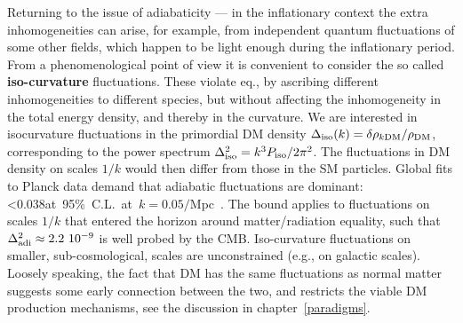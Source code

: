 Returning to the issue of adiabaticity --- in the inflationary context
the extra inhomogeneities can arise, for example, from independent quantum fluctuations
of some other fields, which happen to be light enough during the inflationary period.
From a phenomenological point of view
it is convenient to consider the so called {\bf iso-curvature} fluctuations. 
These violate eq., by ascribing different inhomogeneities to different species,
but without affecting the inhomogeneity in the total energy density, and thereby in the curvature.
We are interested in isocurvature fluctuations in the primordial DM density
$\Delta_{\rm iso} (k)= \delta \rho_{k\rm DM}/\rho_{\rm DM}$, corresponding to the power spectrum $\Delta^2_{\rm iso} = k^3 P_{\rm iso}/2\pi^2$.
The fluctuations in DM density on scales $1/k$ would then differ from those in the SM particles.
Global fits to Planck data demand that adiabatic fluctuations are dominant:
\beq\label{eq:isocurvaturebound}
 <0.038\qquad\hbox{at 95\% C.L.\ at $k =0.05/$Mpc~\cite{Planckresults}.}\eeq
The bound applies to fluctuations on scales $1/k$ that entered the horizon around matter/radiation equality,
such that $\Delta^2_{\rm adi} \approx 2.2~10^{-9}$ is well probed by the CMB.
Iso-curvature fluctuations on smaller, sub-cosmological, scales  are unconstrained (e.g., on galactic scales).
Loosely speaking, the fact that DM has the same fluctuations as normal matter suggests some early
connection between the two, and restricts the viable DM production mechanisms, see the discussion in chapter~\ref{paradigms}.

\medskip

